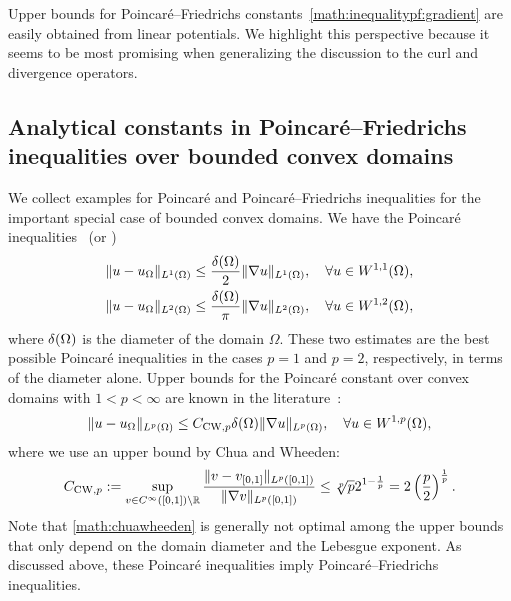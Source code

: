 \documentclass[10pt,a4paper]{article}
\begin{document}
\begin{remark}
    Upper bounds for Poincar\'e--Friedrichs constants~\eqref{math:inequalitypf:gradient} are easily obtained from linear potentials. 
    We highlight this perspective because it seems to be most promising when generalizing the discussion to the curl and divergence operators. 
\end{remark}




\subsection{Analytical constants in Poincar\'e--Friedrichs inequalities over bounded convex domains} \label{subsection: PX_convex}

We collect examples for Poincar\'e and Poincar\'e--Friedrichs inequalities for the important special case of bounded convex domains. 
We have the Poincar\'e inequalities~\cite{Pay_Wei_Poin_conv_60,bebendorf2003note,acosta2004optimal} (or \cite[Lemma~3.24]{ern2021finite}) 
\begin{align}\label{math:acostaduran}
    \| u - u_{\Omega} \|_{L^{1}(\Omega)}
    \leq 
    \frac{{\delta}(\Omega)}{2}
    \| \nabla u \|_{L^{1}(\Omega)}
    ,
    \quad 
    \forall 
    u \in W^{1,1}(\Omega)
    ,
    \\
    \| u - u_{\Omega} \|_{L^{2}(\Omega)} \label{math:bebendorf}
    \leq 
    \frac{{\delta}(\Omega)}{\pi}
    \| \nabla u \|_{L^{2}(\Omega)}
    ,
    \quad 
    \forall 
    u \in W^{1,2}(\Omega)
    ,
\end{align}
where ${\delta}(\Omega)$ is the diameter of the domain $\Omega$.
These two estimates are the best possible Poincar\'e inequalities in the cases $p=1$ and $p=2$, respectively, in terms of the diameter alone. 
Upper bounds for the Poincar\'e constant over convex domains with $1 < p < \infty$ are known in the literature~\cite[Theorem~1.1, Theorem~1.2]{chua2006estimates}:
\begin{align}\label{math:chuawheeden}
    \| u - u_{\Omega} \|_{L^{p}(\Omega)}
    \leq 
    C_{{\rm CW},p}
    {\delta}(\Omega)
    \| \nabla u \|_{L^{p}(\Omega)}
    ,
    \quad 
    \forall 
    u \in W^{1,p}(\Omega)
    ,
\end{align}
where we use an upper bound by Chua and Wheeden:
\begin{align*}
    C_{{\rm CW},p} 
    := 
    \sup\limits_{ v \in C^\infty([0,1]) \setminus {\mathbb R} } 
    \frac{ 
        \| v - v_{[0,1]} \|_{L^{p}([0,1])} 
    }{ 
        \| \nabla v \|_{L^{p}([0,1])} 
    }
    \leq 
    \sqrt[p]{p} 2^{1-\frac 1 p}
    =
    2
    \left( \frac p 2 \right)^{\frac 1 p}
    .
\end{align*} 
Note that \eqref{math:chuawheeden} is generally not optimal among the upper bounds that only depend on the domain diameter and the Lebesgue exponent.
As discussed above, these Poincar\'e inequalities imply Poincar\'e--Friedrichs inequalities. 
\end{document}
